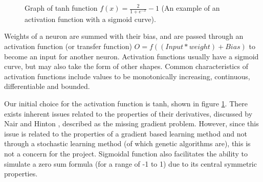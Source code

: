 \documentclass[12pt,a4paper]{article}
\begin{document}
    \begin{figure}
        \centering
        \vspace{-10pt}
        \caption{Graph of tanh function $f(x)={\frac{2}{1+e^{-x}}- 1}$ (An example of an activation function with a sigmoid curve). \label{sigmoid}}
        \vspace{-20pt}
    \end{figure}
    

    Weights of a neuron are summed with their bias, and are passed through an activation function (or transfer function) $O = f((Input* weight) + Bias)$ to become an input for another neuron. Activation functions usually have a sigmoid curve, but may also take the form of other shapes. Common characteristics of activation functions include values to be monotonically increasing, continuous, differentiable and bounded.

    Our initial choice for the activation function is tanh, shown in figure \ref{sigmoid}. There exists inherent issues related to the properties of their derivatives, discussed by Nair and Hinton \cite{nair_rectified_2010}, described as the missing gradient problem. However, since this issue is related to the properties of a gradient based learning method and not through a stochastic learning method (of which genetic algorithms are), this is not a concern for the project. Sigmoidal function also facilitates the ability to simulate a zero sum formula (for a range of -1 to 1) due to its central symmetric properties.
\end{document}
